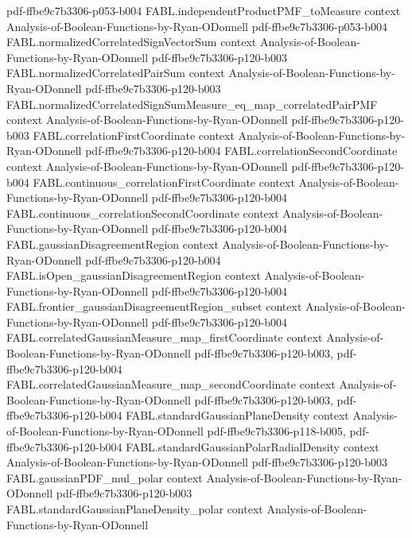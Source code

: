 \begin{theorem}
  {pdf-ffbe9c7b3306-p053-b004}
\proofstep
  {FABL.independentProductPMF_toMeasure}
  {context}
  {Analysis-of-Boolean-Functions-by-Ryan-ODonnell}
  {pdf-ffbe9c7b3306-p053-b004}
\proofstep
  {FABL.normalizedCorrelatedSignVectorSum}
  {context}
  {Analysis-of-Boolean-Functions-by-Ryan-ODonnell}
  {pdf-ffbe9c7b3306-p120-b003}
\proofstep
  {FABL.normalizedCorrelatedPairSum}
  {context}
  {Analysis-of-Boolean-Functions-by-Ryan-ODonnell}
  {pdf-ffbe9c7b3306-p120-b003}
\proofstep
  {FABL.normalizedCorrelatedSignSumMeasure_eq_map_correlatedPairPMF}
  {context}
  {Analysis-of-Boolean-Functions-by-Ryan-ODonnell}
  {pdf-ffbe9c7b3306-p120-b003}
\proofstep
  {FABL.correlationFirstCoordinate}
  {context}
  {Analysis-of-Boolean-Functions-by-Ryan-ODonnell}
  {pdf-ffbe9c7b3306-p120-b004}
\proofstep
  {FABL.correlationSecondCoordinate}
  {context}
  {Analysis-of-Boolean-Functions-by-Ryan-ODonnell}
  {pdf-ffbe9c7b3306-p120-b004}
\proofstep
  {FABL.continuous_correlationFirstCoordinate}
  {context}
  {Analysis-of-Boolean-Functions-by-Ryan-ODonnell}
  {pdf-ffbe9c7b3306-p120-b004}
\proofstep
  {FABL.continuous_correlationSecondCoordinate}
  {context}
  {Analysis-of-Boolean-Functions-by-Ryan-ODonnell}
  {pdf-ffbe9c7b3306-p120-b004}
\proofstep
  {FABL.gaussianDisagreementRegion}
  {context}
  {Analysis-of-Boolean-Functions-by-Ryan-ODonnell}
  {pdf-ffbe9c7b3306-p120-b004}
\proofstep
  {FABL.isOpen_gaussianDisagreementRegion}
  {context}
  {Analysis-of-Boolean-Functions-by-Ryan-ODonnell}
  {pdf-ffbe9c7b3306-p120-b004}
\proofstep
  {FABL.frontier_gaussianDisagreementRegion_subset}
  {context}
  {Analysis-of-Boolean-Functions-by-Ryan-ODonnell}
  {pdf-ffbe9c7b3306-p120-b004}
\proofstep
  {FABL.correlatedGaussianMeasure_map_firstCoordinate}
  {context}
  {Analysis-of-Boolean-Functions-by-Ryan-ODonnell}
  {pdf-ffbe9c7b3306-p120-b003,
    pdf-ffbe9c7b3306-p120-b004}
\proofstep
  {FABL.correlatedGaussianMeasure_map_secondCoordinate}
  {context}
  {Analysis-of-Boolean-Functions-by-Ryan-ODonnell}
  {pdf-ffbe9c7b3306-p120-b003,
    pdf-ffbe9c7b3306-p120-b004}
\proofstep
  {FABL.standardGaussianPlaneDensity}
  {context}
  {Analysis-of-Boolean-Functions-by-Ryan-ODonnell}
  {pdf-ffbe9c7b3306-p118-b005,
    pdf-ffbe9c7b3306-p120-b004}
\proofstep
  {FABL.standardGaussianPolarRadialDensity}
  {context}
  {Analysis-of-Boolean-Functions-by-Ryan-ODonnell}
  {pdf-ffbe9c7b3306-p120-b003}
\proofstep
  {FABL.gaussianPDF_mul_polar}
  {context}
  {Analysis-of-Boolean-Functions-by-Ryan-ODonnell}
  {pdf-ffbe9c7b3306-p120-b003}
\proofstep
  {FABL.standardGaussianPlaneDensity_polar}
  {context}
  {Analysis-of-Boolean-Functions-by-Ryan-ODonnell}

\end{theorem}
